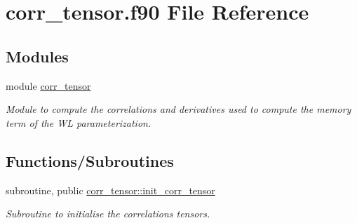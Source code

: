 \hypertarget{corr__tensor_8f90}{}\section{corr\+\_\+tensor.\+f90 File Reference}
\label{corr__tensor_8f90}
\subsection*{Modules}
\begin{DoxyCompactItemize}
\item 
module \hyperlink{namespacecorr__tensor}{corr\+\_\+tensor}
\begin{DoxyCompactList}\small\item\em Module to compute the correlations and derivatives used to compute the memory term of the WL parameterization. \end{DoxyCompactList}\end{DoxyCompactItemize}
\subsection*{Functions/\+Subroutines}
\begin{DoxyCompactItemize}
\item 
subroutine, public \hyperlink{namespacecorr__tensor_a95d9ad1c3ae4a30e2eead85010be9d5d}{corr\+\_\+tensor\+::init\+\_\+corr\+\_\+tensor}
\begin{DoxyCompactList}\small\item\em Subroutine to initialise the correlations tensors. \end{DoxyCompactList}\end{DoxyCompactItemize}
